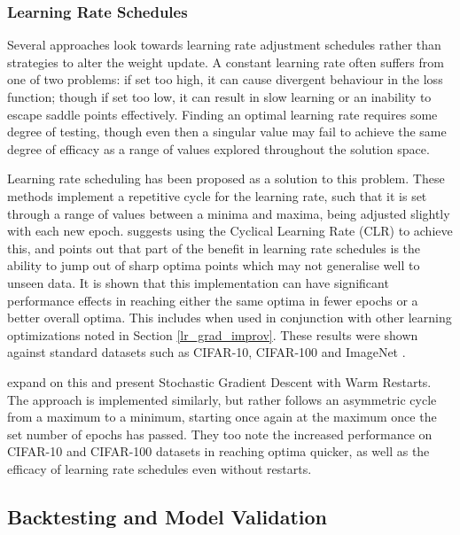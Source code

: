 \documentclass[a4paper,11pt,oneside]{article}
\theoremstyle{plain}
\theoremstyle{definition}
\begin{document}
	
	
	\subsubsection{Learning Rate Schedules}
	
	Several approaches look towards learning rate adjustment schedules rather than strategies to alter the 
	weight update. A constant learning rate often suffers from one of two problems: 
	if set too high, it can cause divergent behaviour in the loss function; though if set too low, it can result in slow 
	learning or an inability to escape saddle points effectively. Finding an optimal learning rate requires some degree
	of testing, though even then a singular value may fail to achieve the same degree of efficacy as a range of values 
	explored throughout the solution space. \newline
	
	Learning rate scheduling has been proposed as a solution to this problem. These methods implement a repetitive cycle 
	for the learning rate, such that it is set through a range of values between a minima and maxima, being adjusted slightly 
	with each new epoch. \citet{Smith} suggests using the Cyclical Learning Rate (CLR) to achieve this, and points out that part of the benefit 
	in learning rate schedules is the ability to jump out of sharp optima points which may not generalise well to unseen data. 
	It is shown that this implementation can have significant performance effects in reaching either the same optima in fewer epochs or a better 
	overall optima. This includes when used in conjunction with other learning optimizations noted in Section \ref{lr_grad_improv}. These results were 
	shown against standard datasets such as CIFAR-10, CIFAR-100 and ImageNet \citep{Smith}. \newline
	
	\citet{Loshchilov} expand on this and present Stochastic Gradient Descent with Warm Restarts. The approach is 
	implemented similarly, but rather follows an asymmetric cycle from a maximum to a minimum, starting once again at the maximum once the set number 
	of epochs has passed. They too note the increased performance on CIFAR-10 and CIFAR-100 datasets in reaching optima quicker, as well as the efficacy of 
	learning rate schedules even without restarts.
	
	
	
	\subsection{Backtesting and Model Validation} \label{lr_backtesting}
	\hfill
	
\end{document}
